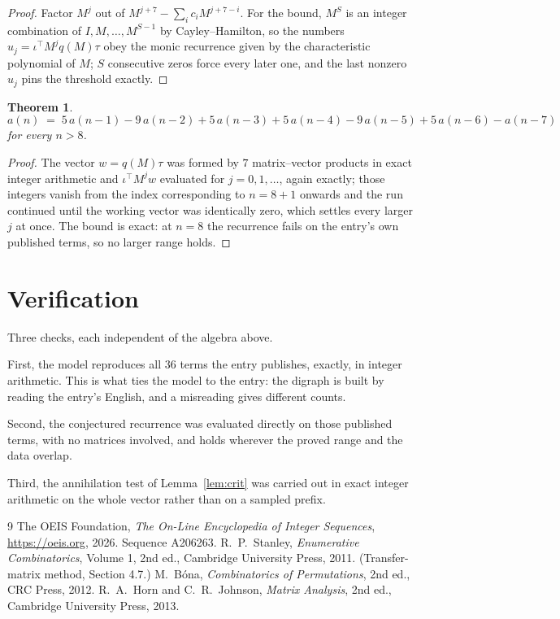 \documentclass[11pt,a4paper]{article}
\theoremstyle{plain}
\newtheorem{theorem}{Theorem}
\theoremstyle{definition}
\begin{document}
\begin{proof}
Factor $M^{j}$ out of $M^{j+7}-\sum_ic_iM^{j+7-i}$. For the bound, $M^{S}$
is an integer combination of $I,M,\dots,M^{S-1}$ by Cayley--Hamilton, so the numbers
$u_j=\iota^{\!\top}M^{j}q(M)\tau$ obey the monic recurrence given by the characteristic
polynomial of $M$; $S$ consecutive zeros force every later one, and the last nonzero $u_j$
pins the threshold exactly.
\end{proof}

\begin{theorem}
\[
a(n)\;=\;5\,a(n-1) - 9\,a(n-2) + 5\,a(n-3) + 5\,a(n-4) - 9\,a(n-5) + 5\,a(n-6) - a(n-7)
\]
for every $n>8$.
\end{theorem}

\begin{proof}
The vector $w=q(M)\tau$ was formed by $7$ matrix--vector products in exact integer
arithmetic and $\iota^{\!\top}M^{j}w$ evaluated for $j=0,1,\dots$, again exactly; those
integers vanish from the index corresponding to $n=8+1$ onwards and the run continued
until the working vector was identically zero, which settles every larger $j$ at once. The bound is exact: at $n=8$ the recurrence fails on the entry's own published terms, so no larger range holds.
\end{proof}

\section{Verification}

Three checks, each independent of the algebra above.

First, the model reproduces all $36$ terms the entry publishes, exactly, in integer
arithmetic. This is what ties the model to the entry: the digraph is built by reading the
entry's English, and a misreading gives different counts.

Second, the conjectured recurrence was evaluated directly on those published terms, with no
matrices involved, and holds wherever the proved range and the data overlap.

Third, the annihilation test of Lemma~\ref{lem:crit} was carried out in exact integer
arithmetic on the whole vector rather than on a sampled prefix.

\begin{thebibliography}{9}
 The OEIS Foundation, \emph{The On-Line Encyclopedia of Integer
Sequences}, \url{https://oeis.org}, 2026. Sequence A206263.
 R.~P.~Stanley, \emph{Enumerative Combinatorics}, Volume 1, 2nd ed.,
Cambridge University Press, 2011. (Transfer-matrix method, Section 4.7.)
 M.~B\'ona, \emph{Combinatorics of Permutations}, 2nd ed., CRC
Press, 2012.
 R.~A.~Horn and C.~R.~Johnson, \emph{Matrix Analysis}, 2nd ed., Cambridge
University Press, 2013.
\end{thebibliography}
\end{document}
